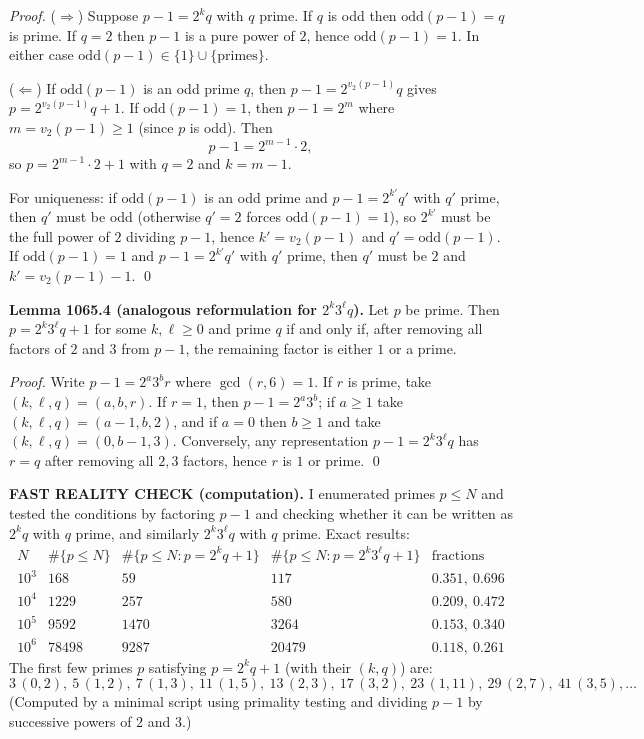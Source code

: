 \emph{Proof.}
($\Rightarrow$) Suppose $p-1=2^k q$ with $q$ prime.  If $q$ is odd then $\mathrm{odd}(p-1)=q$ is prime.  If $q=2$ then $p-1$ is a pure power of $2$, hence $\mathrm{odd}(p-1)=1$.  In either case $\mathrm{odd}(p-1)\in\{1\}\cup\{\text{primes}\}$.

($\Leftarrow$) If $\mathrm{odd}(p-1)$ is an odd prime $q$, then $p-1=2^{v_2(p-1)}q$ gives $p=2^{v_2(p-1)}q+1$.
If $\mathrm{odd}(p-1)=1$, then $p-1=2^m$ where $m=v_2(p-1)\ge 1$ (since $p$ is odd).  Then
\[
  p-1 = 2^{m-1}\cdot 2,
\]
so $p=2^{m-1}\cdot 2 + 1$ with $q=2$ and $k=m-1$.

For uniqueness: if $\mathrm{odd}(p-1)$ is an odd prime and $p-1=2^{k'}q'$ with $q'$ prime, then $q'$ must be odd (otherwise $q'=2$ forces $\mathrm{odd}(p-1)=1$), so $2^{k'}$ must be the full power of $2$ dividing $p-1$, hence $k'=v_2(p-1)$ and $q'=\mathrm{odd}(p-1)$.
If $\mathrm{odd}(p-1)=1$ and $p-1=2^{k'}q'$ with $q'$ prime, then $q'$ must be $2$ and $k'=v_2(p-1)-1$.
\qed

\textbf{Lemma 1065.4 (analogous reformulation for $2^k3^\ell q$).}
Let $p$ be prime.  Then $p=2^k3^\ell q+1$ for some $k,\ell\ge 0$ and prime $q$ if and only if, after removing all factors of $2$ and $3$ from $p-1$, the remaining factor is either $1$ or a prime.

\emph{Proof.}
Write $p-1 = 2^a3^b r$ where $\gcd(r,6)=1$.  If $r$ is prime, take $(k,\ell,q)=(a,b,r)$.  If $r=1$, then $p-1=2^a3^b$; if $a\ge 1$ take $(k,\ell,q)=(a-1,b,2)$, and if $a=0$ then $b\ge 1$ and take $(k,\ell,q)=(0,b-1,3)$.  Conversely, any representation $p-1=2^k3^\ell q$ has $r=q$ after removing all $2,3$ factors, hence $r$ is $1$ or prime. \qed

\textbf{FAST REALITY CHECK (computation).}
I enumerated primes $p\le N$ and tested the conditions by factoring $p-1$ and checking whether it can be written as $2^k q$ with $q$ prime, and similarly $2^k3^\ell q$ with $q$ prime.  Exact results:
\[
\begin{array}{r|r|r|r|r}
N & \#\{p\le N\} & \#\{p\le N: p=2^k q+1\} & \#\{p\le N: p=2^k3^\ell q+1\} & \text{fractions} \\ \hline
10^3 & 168 & 59 & 117 & 0.351,\ 0.696 \\
10^4 & 1229 & 257 & 580 & 0.209,\ 0.472 \\
10^5 & 9592 & 1470 & 3264 & 0.153,\ 0.340 \\
10^6 & 78498 & 9287 & 20479 & 0.118,\ 0.261
\end{array}
\]
The first few primes $p$ satisfying $p=2^kq+1$ (with their $(k,q)$) are:
\[
3\,(0,2),\ 5\,(1,2),\ 7\,(1,3),\ 11\,(1,5),\ 13\,(2,3),\ 17\,(3,2),\ 23\,(1,11),\ 29\,(2,7),\ 41\,(3,5),\ldots
\]
(Computed by a minimal script using primality testing and dividing $p-1$ by successive powers of $2$ and $3$.)

